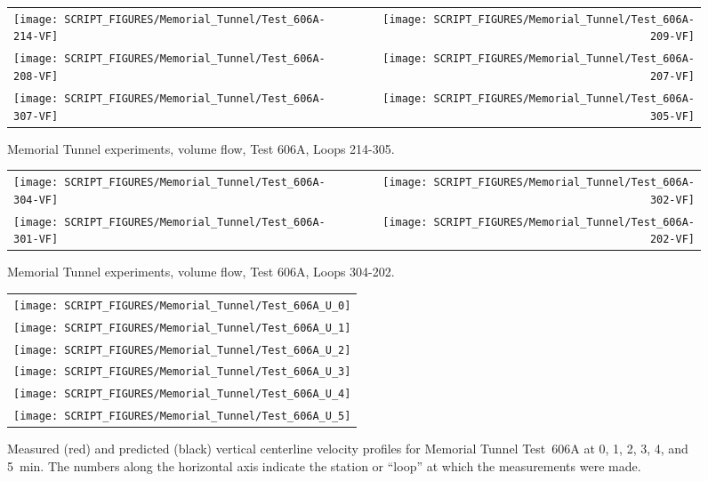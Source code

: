 \newpage

\begin{figure}[p]
\begin{tabular*}{\textwidth}{l@{\extracolsep{\fill}}r}
\texttt{[image: SCRIPT\_FIGURES/Memorial\_Tunnel/Test\_606A-214-VF]} &
\texttt{[image: SCRIPT\_FIGURES/Memorial\_Tunnel/Test\_606A-209-VF]} \\
\texttt{[image: SCRIPT\_FIGURES/Memorial\_Tunnel/Test\_606A-208-VF]} &
\texttt{[image: SCRIPT\_FIGURES/Memorial\_Tunnel/Test\_606A-207-VF]} \\
\texttt{[image: SCRIPT\_FIGURES/Memorial\_Tunnel/Test\_606A-307-VF]} &
\texttt{[image: SCRIPT\_FIGURES/Memorial\_Tunnel/Test\_606A-305-VF]}
\end{tabular*}
\caption[Memorial Tunnel experiments, volume flow, Test 606A, Loops 214-305]{Memorial Tunnel experiments, volume flow, Test 606A, Loops 214-305.}
\label{Memorial_Tunnel_606A_214-305}
\end{figure}

\begin{figure}[p]
\begin{tabular*}{\textwidth}{l@{\extracolsep{\fill}}r}
\texttt{[image: SCRIPT\_FIGURES/Memorial\_Tunnel/Test\_606A-304-VF]} &
\texttt{[image: SCRIPT\_FIGURES/Memorial\_Tunnel/Test\_606A-302-VF]} \\
\texttt{[image: SCRIPT\_FIGURES/Memorial\_Tunnel/Test\_606A-301-VF]} &
\texttt{[image: SCRIPT\_FIGURES/Memorial\_Tunnel/Test\_606A-202-VF]} 
\end{tabular*}
\caption[Memorial Tunnel experiments, volume flow, Test 606A, Loops 304-202]{Memorial Tunnel experiments, volume flow, Test 606A, Loops 304-202.}
\label{Memorial_Tunnel_606A_304-202}
\end{figure}

\begin{figure}[p]
\begin{tabular*}{\textwidth}{c}
\texttt{[image: SCRIPT\_FIGURES/Memorial\_Tunnel/Test\_606A\_U\_0]} \\
\texttt{[image: SCRIPT\_FIGURES/Memorial\_Tunnel/Test\_606A\_U\_1]} \\
\texttt{[image: SCRIPT\_FIGURES/Memorial\_Tunnel/Test\_606A\_U\_2]} \\
\texttt{[image: SCRIPT\_FIGURES/Memorial\_Tunnel/Test\_606A\_U\_3]} \\
\texttt{[image: SCRIPT\_FIGURES/Memorial\_Tunnel/Test\_606A\_U\_4]} \\
\texttt{[image: SCRIPT\_FIGURES/Memorial\_Tunnel/Test\_606A\_U\_5]}
\end{tabular*}
\caption[Memorial Tunnel experiments, velocity profiles, Test 606A, 0-5 min]{Measured (red) and predicted (black) vertical centerline velocity profiles for Memorial Tunnel Test~606A at 0, 1, 2, 3, 4, and 5~min. The numbers along the horizontal axis indicate the station or ``loop'' at which the measurements were made.}
\label{Memorial_606A_U_0-5}
\end{figure}


